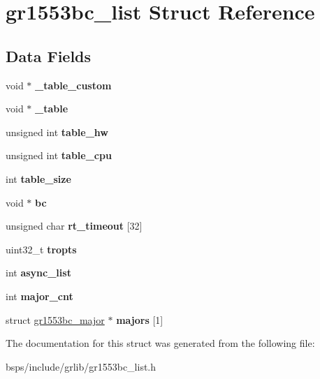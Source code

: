 \hypertarget{structgr1553bc__list}{}\section{gr1553bc\+\_\+list Struct Reference}
\label{structgr1553bc__list}
\subsection*{Data Fields}
\begin{DoxyCompactItemize}
\item 
\mbox{\label{structgr1553bc__list_a32dfc383960df6303f83bed6d2da84eb}} 
void $\ast$ {\bfseries \+\_\+table\+\_\+custom}
\item 
\mbox{\label{structgr1553bc__list_af76aaf603a3d108f2e9465d3372ceb1e}} 
void $\ast$ {\bfseries \+\_\+table}
\item 
\mbox{\label{structgr1553bc__list_a5a966a61628deb890979ded7aab0fb98}} 
unsigned int {\bfseries table\+\_\+hw}
\item 
\mbox{\label{structgr1553bc__list_a869a6f29bb0518a70dbb5e8efa8a3969}} 
unsigned int {\bfseries table\+\_\+cpu}
\item 
\mbox{\label{structgr1553bc__list_a7ee232372b93e011137061ef0c05489b}} 
int {\bfseries table\+\_\+size}
\item 
\mbox{\label{structgr1553bc__list_ad2246bb1868fa2818650b9801111fc90}} 
void $\ast$ {\bfseries bc}
\item 
\mbox{\label{structgr1553bc__list_a0a4bcef5f7f32135f6f865c81ad2b4e0}} 
unsigned char {\bfseries rt\+\_\+timeout} \mbox{[}32\mbox{]}
\item 
\mbox{\label{structgr1553bc__list_a30c14d3aba3f64c59f0fd8177fdca139}} 
uint32\+\_\+t {\bfseries tropts}
\item 
\mbox{\label{structgr1553bc__list_a602fcf1c797e98080c29be0af4213446}} 
int {\bfseries async\+\_\+list}
\item 
\mbox{\label{structgr1553bc__list_a6c58d29dca7155a995697d7145759dce}} 
int {\bfseries major\+\_\+cnt}
\item 
\mbox{\label{structgr1553bc__list_a33b6b0fafb98978807c088e427921bc9}} 
struct \mbox{\hyperlink{structgr1553bc__major}{gr1553bc\+\_\+major}} $\ast$ {\bfseries majors} \mbox{[}1\mbox{]}
\end{DoxyCompactItemize}


The documentation for this struct was generated from the following file\+:\begin{DoxyCompactItemize}
\item 
bsps/include/grlib/gr1553bc\+\_\+list.\+h\end{DoxyCompactItemize}
